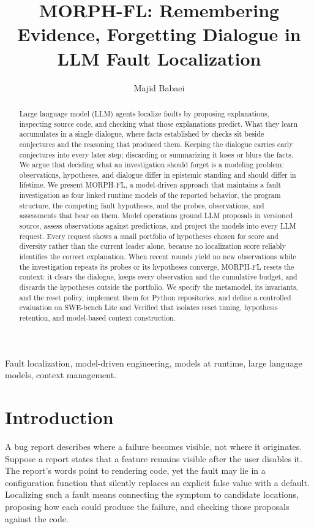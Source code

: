 \documentclass[letterpaper,journal]{IEEEtran}
\newcommand{\tool}{MORPH-FL}
\begin{document}
\raggedbottom %
\title{MORPH-FL: Remembering Evidence, Forgetting Dialogue in LLM Fault Localization}
\author{Majid Babaei}
\maketitle
\begin{abstract}
Large language model (LLM) agents localize faults by proposing explanations, inspecting source code, and checking what those explanations predict. What they learn accumulates in a single dialogue, where facts established by checks sit beside conjectures and the reasoning that produced them. Keeping the dialogue carries early conjectures into every later step; discarding or summarizing it loses or blurs the facts. We argue that deciding what an investigation should forget is a modeling problem: observations, hypotheses, and dialogue differ in epistemic standing and should differ in lifetime. We present \tool{}, a model-driven approach that maintains a fault investigation as four linked runtime models of the reported behavior, the program structure, the competing fault hypotheses, and the probes, observations, and assessments that bear on them. Model operations ground LLM proposals in versioned source, assess observations against predictions, and project the models into every LLM request. Every request shows a small portfolio of hypotheses chosen for score and diversity rather than the current leader alone, because no localization score reliably identifies the correct explanation. When recent rounds yield no new observations while the investigation repeats its probes or its hypotheses converge, \tool{} resets the context: it clears the dialogue, keeps every observation and the cumulative budget, and discards the hypotheses outside the portfolio. We specify the metamodel, its invariants, and the reset policy, implement them for Python repositories, and define a controlled evaluation on SWE-bench Lite and Verified that isolates reset timing, hypothesis retention, and model-based context construction.
\end{abstract}
\begin{IEEEkeywords}
Fault localization, model-driven engineering, models at runtime, large language models, context management.
\end{IEEEkeywords}

\section{Introduction}\label{sec:intro}
A bug report describes where a failure becomes visible, not where it originates. Suppose a report states that a feature remains visible after the user disables it. The report's words point to rendering code, yet the fault may lie in a configuration function that silently replaces an explicit false value with a default. Localizing such a fault means connecting the symptom to candidate locations, proposing how each could produce the failure, and checking those proposals against the code.
\end{document}
